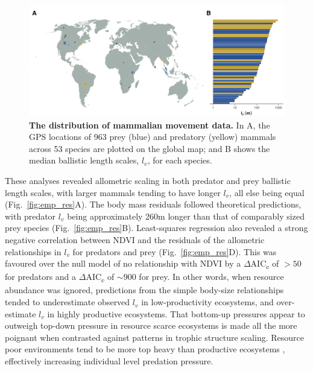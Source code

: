 \documentclass[12pt]{article}
\begin{document}
\begin{figure}[!h]
\centering
\includegraphics[scale=0.9]{Map.png}
\caption{\textbf{The distribution of mammalian movement data.} In A, the GPS locations of 963 prey (blue) and predatory (yellow) mammals across 53 species are plotted on the global map; and B shows the median ballistic length scales, $l_v$, for each species.}
\label{fig:map}
\end{figure}


These analyses revealed allometric scaling in both predator and prey ballistic length scales, with larger mammals tending to have longer $l_v$, all else being equal (Fig.~\ref{fig:emp_res}A). The body mass residuals followed theoretical predictions, with predator $l_v$ being approximately 260m longer than that of comparably sized prey species (Fig.~\ref{fig:emp_res}B). Least-squares regression also revealed a strong negative correlation between NDVI and the residuals of the allometric relationships in $l_v$ for predators and prey (Fig.~\ref{fig:emp_res}D). This was favoured over the null model of no relationship with NDVI by a $\Delta$AIC\textsubscript{c} of $>50$ for predators and a $\Delta$AIC\textsubscript{c} of $\sim900$ for prey. In other words, when resource abundance was ignored, predictions from the simple body-size relationships tended to underestimate observed $l_v$ in low-productivity ecosystems, and over-estimate $l_v$ in highly productive ecosystems. That bottom-up pressures appear to outweigh top-down pressure in resource scarce ecosystems is made all the more poignant when contrasted against patterns in trophic structure scaling. Resource poor environments tend to be more top heavy than productive ecosystems \cite{Hatton:2015}, effectively increasing individual level predation pressure.
\end{document}
